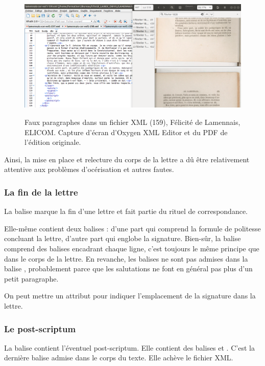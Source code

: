 \begin{figure}[ht]
    \centering
    \caption{Faux paragraphes dans un fichier XML (159), Félicité de Lamennais, ELICOM. Capture d'écran d'Oxygen XML Editor et du PDF de l'édition originale.}
    \includegraphics[width=15cm]{images/tirets.png}
    \label{tirets}
\end{figure}

Ainsi, la mise en place et relecture du corps de la lettre a dû être relativement attentive aux problèmes d'océrisation et autres fautes.

\subsubsection{La fin de la lettre}

La balise  marque la fin d'une lettre et fait partie du rituel de correspondance.

Elle-même contient deux balises : d'une part  qui comprend la formule de politesse concluant la lettre, d'autre part  qui englobe la signature. Bien-sûr, la balise  comprend des balises  encadrant chaque ligne, c'est toujours le même principe que dans le corps de la lettre. En revanche, les balises  ne sont pas admises dans la balise , probablement parce que les salutations ne font en général pas plus d'un petit paragraphe.

On peut mettre un attribut  pour indiquer l'emplacement de la signature dans la lettre.

\subsubsection{Le post-scriptum}

La balise  contient l'éventuel post-scriptum. Elle contient des balises  et .
C'est la dernière balise admise dans le corps du texte. Elle achève le fichier XML.

